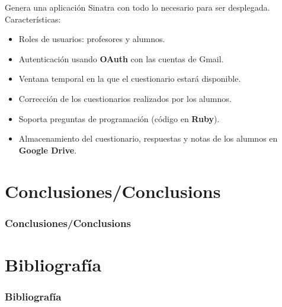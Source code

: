 \documentclass{beamer}
\begin{document}
\begin{frame}[allowframebreaks]
  Genera una aplicación Sinatra con todo lo necesario para ser desplegada.
  Características:
  \begin{itemize}
    \item Roles de usuarios: profesores y alumnos.
    \item Autenticación usando {\bfseries OAuth} con las cuentas de Gmail.
    \item Ventana temporal en la que el cuestionario estará disponible.
    \item Corrección de los cuestionarios realizados por los alumnos.
    \item Soporta preguntas de programación (código en {\bfseries Ruby}).
    \item Almacenamiento del cuestionario, respuestas y notas de los alumnos en {\bfseries Google Drive}.
  \end{itemize}
  \framebreak
\end{frame}

\section{Conclusiones/Conclusions}
\begin{frame}
  \frametitle{Conclusiones/Conclusions}
%   
\end{frame}


\section{Bibliografía}
\begin{frame}[allowframebreaks]
  \frametitle{Bibliografía}
  
  
  \nocite{*}
\end{frame}
\end{document}
